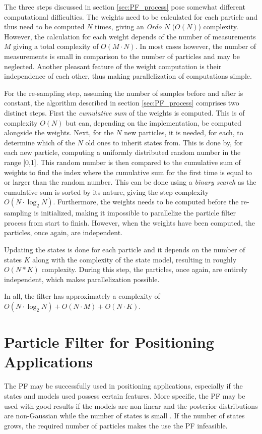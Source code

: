 \documentclass{LTHthesis}
\begin{document}
The three steps discussed in section \ref{sec:PF_process} pose somewhat different computational difficulties. The weights need to be calculated for each particle and thus need to be computed $N$ times, giving an \emph{Ordo $N$} ($O(N)$) complexity. However, the calculation for each weight depends of the number of measurements $M$ giving a total complexity of $O(M\cdot N)$. In most cases however, the number of measurements is small in comparison to the number of particles and may be neglected. Another pleasant feature of the weight computation is their independence of each other, thus making parallelization of computations simple.

For the re-sampling step, assuming the number of samples before and after is constant, the algorithm described in section \ref{sec:PF_process} comprises two distinct steps. First the \emph{cumulative sum} of the weights is computed. This is of complexity $O(N)$ but can, depending on the implementation, be computed alongside the weights. Next, for the $N$ new particles, it is needed, for each, to determine which of the $N$ old ones to inherit states from. This is done by, for each new particle, computing a uniformly distributed random number in the range [0,1]. This random number is then compared to the cumulative sum of weights to find the index where the cumulative sum for the first time is equal to or larger than the random number. This can be done using a \emph{binary search} as the cumulative sum is sorted by its nature, giving the step complexity $O(N\cdot\log_2{N})$. Furthermore, the weights needs to be computed before the re-sampling is initialized, making it impossible to parallelize the particle filter process from start to finish. However, when the weights have been computed, the particles, once again, are independent. 

Updating the states is done for each particle and it depends on the number of states $K$ along with the complexity of the state model, resulting in roughly $O(N*K)$ complexity. During this step, the particles, once again, are entirely independent, which makes parallelization possible.

In all, the filter has approximately a complexity of $O(N\cdot\log_2{N}) + O(N\cdot M) + O(N\cdot K)$.
%
\section{Particle Filter for Positioning Applications}
%
The PF may be successfully used in positioning applications, especially if the states and models used possess certain features. More specific, the PF may be used with good results if the models are non-linear and the posterior distributions are non-Gaussian while the number of states is small \cite{gson12}. If the number of states grows, the required number of particles makes the use the PF infeasible.
\end{document}
